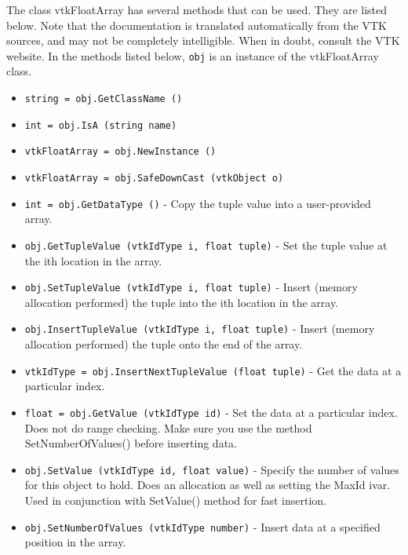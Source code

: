The class vtkFloatArray has several methods that can be used.
  They are listed below.
Note that the documentation is translated automatically from the VTK sources,
and may not be completely intelligible.  When in doubt, consult the VTK website.
In the methods listed below, \verb|obj| is an instance of the vtkFloatArray class.
\begin{itemize}
\item  \verb|string = obj.GetClassName ()|

\item  \verb|int = obj.IsA (string name)|

\item  \verb|vtkFloatArray = obj.NewInstance ()|

\item  \verb|vtkFloatArray = obj.SafeDownCast (vtkObject o)|

\item  \verb|int = obj.GetDataType ()| -  Copy the tuple value into a user-provided array.

\item  \verb|obj.GetTupleValue (vtkIdType i, float tuple)| -  Set the tuple value at the ith location in the array.

\item  \verb|obj.SetTupleValue (vtkIdType i, float tuple)| -  Insert (memory allocation performed) the tuple into the ith location
 in the array.

\item  \verb|obj.InsertTupleValue (vtkIdType i, float tuple)| -  Insert (memory allocation performed) the tuple onto the end of the array.

\item  \verb|vtkIdType = obj.InsertNextTupleValue (float tuple)| -  Get the data at a particular index.

\item  \verb|float = obj.GetValue (vtkIdType id)| -  Set the data at a particular index. Does not do range checking. Make sure
 you use the method SetNumberOfValues() before inserting data.

\item  \verb|obj.SetValue (vtkIdType id, float value)| -  Specify the number of values for this object to hold. Does an
 allocation as well as setting the MaxId ivar. Used in conjunction with
 SetValue() method for fast insertion.

\item  \verb|obj.SetNumberOfValues (vtkIdType number)| -  Insert data at a specified position in the array.


\end{itemize}
